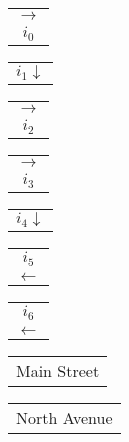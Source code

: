 \documentclass{book}
\begin{document}
\stopmpxshipout
\mpxshipout%
{\small \renewcommand{\arraystretch}{.9}
              \begin{tabular}[t]{@{}c@{}}
                  $\longrightarrow$ \\ $i_0$     
              \end{tabular}}%
\stopmpxshipout
\mpxshipout%
{\small \renewcommand{\arraystretch}{.9}
              \begin{tabular}[t]{@{}r@{}}
                  $i_1 \downarrow$    
              \end{tabular}}%
\stopmpxshipout
\mpxshipout%
{\small \renewcommand{\arraystretch}{.9}
              \begin{tabular}[t]{@{}c@{}}
                  $\longrightarrow$ \\ $i_2$     
              \end{tabular}}%
\stopmpxshipout
\mpxshipout%
{\small \renewcommand{\arraystretch}{.9}
              \begin{tabular}[t]{@{}c@{}}
                  $\longrightarrow$ \\ $i_3$     
              \end{tabular}}%
\stopmpxshipout
\mpxshipout%
{\small \renewcommand{\arraystretch}{.9}
              \begin{tabular}[t]{@{}r@{}}
                  $i_4 \downarrow$    
              \end{tabular}}%
\stopmpxshipout
\mpxshipout%
{\small \renewcommand{\arraystretch}{.9}
              \begin{tabular}[b]{@{}c@{}}
                   $i_5$ \\ $\longleftarrow$     
              \end{tabular}}%
\stopmpxshipout
\mpxshipout%
{\small \renewcommand{\arraystretch}{.9}
              \begin{tabular}[b]{@{}c@{}}
                   $i_6$ \\ $\longleftarrow$     
              \end{tabular}}%
\stopmpxshipout
\mpxshipout%
{\small \renewcommand{\arraystretch}{.9}
              \circuitfont\begin{tabular}[b]{@{}c@{}}
                  Main Street     
              \end{tabular}}%
\stopmpxshipout
\mpxshipout%
{\small \renewcommand{\arraystretch}{.9}
              \circuitfont\begin{tabular}{@{}l@{}}
                  North Avenue   
              \end{tabular}}%
\end{document}
